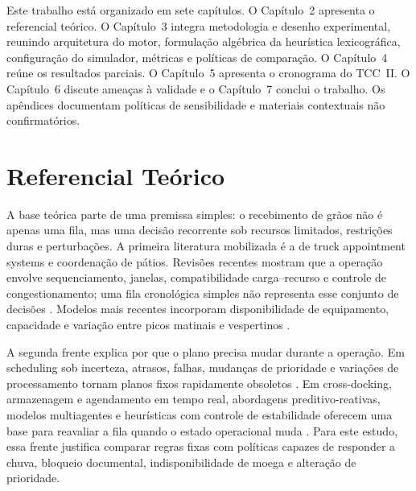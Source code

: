 \documentclass[
  12pt,
  oneside,
  a4paper,
  sumario=tradicional,
  brazil
]{abntex2}
\begin{document}
Este trabalho est\'a organizado em sete cap\'itulos. O Cap\'itulo~2 apresenta o referencial te\'orico. O Cap\'itulo~3 integra metodologia e desenho experimental, reunindo arquitetura do motor, formula\c{c}\~ao alg\'ebrica da heur\'istica lexicogr\'afica, configura\c{c}\~ao do simulador, m\'etricas e pol\'iticas de compara\c{c}\~ao. O Cap\'itulo~4 re\'une os resultados parciais. O Cap\'itulo~5 apresenta o cronograma do TCC~II. O Cap\'itulo~6 discute amea\c{c}as \`a validade e o Cap\'itulo~7 conclui o trabalho. Os ap\^endices documentam pol\'iticas de sensibilidade e materiais contextuais n\~ao confirmat\'orios.

\chapter{Referencial Teórico}\label{ch:referencial}
A base te\'orica parte de uma premissa simples: o recebimento de gr\~aos n\~ao \'e apenas uma fila, mas uma decis\~ao recorrente sob recursos limitados, restri\c{c}\~oes duras e perturba\c{c}\~oes. A primeira literatura mobilizada \'e a de truck appointment systems e coordena\c{c}\~ao de p\'atios. Revis\~oes recentes mostram que a opera\c{c}\~ao envolve sequenciamento, janelas, compatibilidade carga--recurso e controle de congestionamento; uma fila cronol\'ogica simples n\~ao representa esse conjunto de decis\~oes \parencite{abdelmagidComprehensiveReviewTruck2022a, graciaTruckAppointmentScheduling2025a}. Modelos mais recentes incorporam disponibilidade de equipamento, capacidade e varia\c{c}\~ao entre picos matinais e vespertinos \parencite{xuOptimizationMulticonstraintTruck2021a, bouyahiaNovelTruckAppointment2025b}.

A segunda frente explica por que o plano precisa mudar durante a opera\c{c}\~ao. Em scheduling sob incerteza, atrasos, falhas, mudan\c{c}as de prioridade e varia\c{c}\~oes de processamento tornam planos fixos rapidamente obsoletos \parencite{liProcessSchedulingUncertainty2008a}. Em cross-docking, armazenagem e agendamento em tempo real, abordagens preditivo-reativas, modelos multiagentes e heur\'isticas com controle de estabilidade oferecem uma base para reavaliar a fila quando o estado operacional muda \parencite{boysenCrossDockScheduling2010a, nasiriPredictivereactiveCrossdockRescheduling2022, wangFlexibleStorageYard2023, torbaliMultiagentbasedRealtimeTruck2023, fonsecaStabilityApproachCDC2025}. Para este estudo, essa frente justifica comparar regras fixas com pol\'iticas capazes de responder a chuva, bloqueio documental, indisponibilidade de moega e altera\c{c}\~ao de prioridade.
\end{document}
